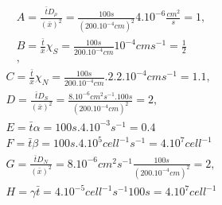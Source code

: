 \documentclass[11pt,twoside]{article}
\numberwithin{equation}{section}
\theoremstyle{plain}
\theoremstyle{nonumberplain}
\begin{document}
\begin{eqnarray*}
A=\frac{\bar{t}D_\rho}{(\bar{x})^2}=\frac{100s}{(200.10^{-4}cm)^2}4.10^{-6}\frac{cm^2}{s}=1,\\
B= \frac{\bar{t}}{\bar{x}}\chi_S=\frac{100s}{200.10^{-4}cm}10^{-4}cms^{-1}=\frac{1}{2}\\,\end{eqnarray*}
\begin{eqnarray*}
C=\frac{\bar{t}}{\bar{x}} \chi_N=\frac{100s}{200.10^{-4}cm}.2.2.10^{-4}cms^{-1}=1.1,\\
D=\frac{\bar{t}D_S}{(\bar{x})^2}=\frac{8.10^{-6}cm^2s^{-1}.100 s}{(200.10^{-4}cm)^2}=2,\\
E=\bar{t}\alpha=100s.4.10^{-3}s^{-1}=0.4\\
F=\bar{t}\beta=100s.4.10^5cell^{-1}s^{-1}=4.10^7cell^{-1}\\
G=\frac{\bar{t}D_N}{(\bar{x})^2}=8.10^{-6}cm^2s^{-1}\frac{100s}{(200.10^{-4}cm)^2}=2,\\
H=\gamma\bar{t}=4.10^{-5}cell^{-1}s^{-1}100s=4.10^{7}cell^{-1}
\end{eqnarray*}

\fi



\end{document}
